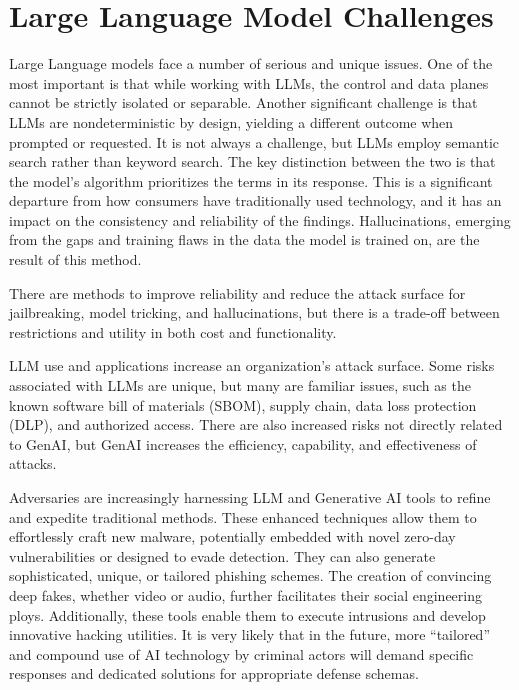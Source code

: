 

\headerimage

\chapter{Large Language Model Challenges}

Large Language models face a number of serious and unique issues. One of the
most important is that while working with LLMs, the control and data planes
cannot be strictly isolated or separable. Another significant challenge is
that LLMs are nondeterministic by design, yielding a different outcome when
prompted or requested. It is not always a challenge, but LLMs employ semantic
search rather than keyword search. The key distinction between the two is that
the model's algorithm prioritizes the terms in its response. This is a
significant departure from how consumers have traditionally used technology,
and it has an impact on the consistency and reliability of the findings.
Hallucinations, emerging from the gaps and training flaws in the data the model
is trained on, are the result of this method.

There are methods to improve reliability and reduce the attack surface for
jailbreaking, model tricking, and hallucinations, but there is a trade-off
between restrictions and utility in both cost and functionality.

LLM use and applications increase an organization's attack surface. Some risks
associated with LLMs are unique, but many are familiar issues, such as the
known software bill of materials (SBOM), supply chain, data loss protection
(DLP), and authorized access. There are also increased risks not directly
related to GenAI, but GenAI increases the efficiency, capability, and
effectiveness of attacks.

Adversaries are increasingly harnessing LLM and Generative AI tools to refine
and expedite traditional methods. These enhanced techniques allow them to
effortlessly craft new malware, potentially embedded with novel zero-day
vulnerabilities or designed to evade detection. They can also generate
sophisticated, unique, or tailored phishing schemes. The creation of convincing
deep fakes, whether video or audio, further facilitates their social
engineering ploys. Additionally, these tools enable them to execute intrusions
and develop innovative hacking utilities. It is very likely that in the future,
more “tailored” and compound use of AI technology by criminal actors will demand
specific responses and dedicated solutions for appropriate defense schemas.

